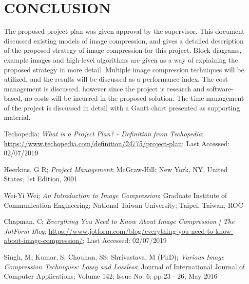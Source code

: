 \documentclass[10pt,twocolumn, a4paper]{witseiepaper}
\begin{document}
%
\section{CONCLUSION}
\label{sec: Conclusion}
The proposed project plan was given approval by the supervisor. This document discussed existing models of image compression, and gives a detailed description of the proposed strategy of image compression for this project. Block diagrams, example images and high-level algorithms are given as a way of explaining the proposed strategy in more detail. Multiple image compression techniques will be utilized, and the results will be discussed as a performance index. The cost management is discussed, however since the project is research and software-based, no costs will be incurred in the proposed solution. The time management of the project is discussed in detail with a Gantt chart presented as supporting material.

%
\begin{thebibliography}{}


Techopedia; \emph{What is a Project Plan? - Definition from Techopedia}; \url{https://www.techopedia.com/definition/24775/project-plan}; Last Accessed: 02/07/2019

Heerkins, G R; \emph{Project Management}; McGraw-Hill; New York, NY, United States; 1st Edition, 2001

Wei-Yi Wei; \emph{An Introduction to Image Compression}; Graduate Institute of Communication Engineering; National Taiwan University; Taipei, Taiwan, ROC

Chapman, C; \emph{Everything You Need to Know About Image Compression | The JotForm Blog}; \url{https://www.jotform.com/blog/everything-you-need-to-know-about-image-compression/}; Last Accessed: 02/07/2019

Singh, M; Kumar, S; Chouhan, SS; Shrivastava, M (PhD); \emph{Various Image Compression Techniques: Lossy and Lossless}; Journal of International Journal of Computer Applications; Volume 142; Issue No. 6; pp 23 - 26; May 2016

\end{thebibliography}
\end{document}
